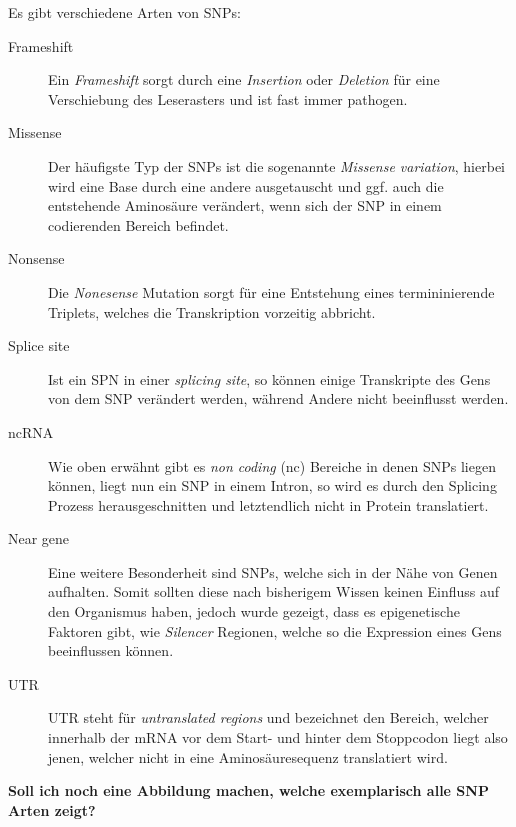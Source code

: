 Es gibt verschiedene Arten von \ac{SNPs}:

\begin{description}
\item[Frameshift]
Ein \emph{Frameshift} sorgt durch eine \emph{Insertion} oder \emph{Deletion} für eine Verschiebung des Leserasters und ist fast immer pathogen.
\item[Missense]
Der häufigste Typ der \ac{SNPs} ist die sogenannte \emph{Missense variation}, hierbei wird eine Base durch eine andere ausgetauscht und ggf. auch die entstehende Aminosäure verändert, wenn sich der \ac{SNP} in einem codierenden Bereich befindet. 
\item[Nonsense]
Die \emph{Nonesense} Mutation sorgt für eine Entstehung eines termininierende Triplets, welches die Transkription vorzeitig abbricht.
\item[Splice site]
Ist ein SPN in einer \emph{splicing site}, so können einige Transkripte des Gens von dem \ac{SNP} verändert werden, während Andere nicht beeinflusst werden.
\item[ncRNA]
Wie oben erwähnt gibt es \emph{non coding} (nc) Bereiche in denen \ac{SNPs} liegen können, liegt nun ein \ac{SNP} in einem Intron, so wird es durch den Splicing Prozess herausgeschnitten und letztendlich nicht in Protein translatiert. 
\item[Near gene]
Eine weitere Besonderheit sind SNPs, welche sich in der Nähe von Genen aufhalten. Somit sollten diese nach bisherigem Wissen keinen Einfluss auf den Organismus haben, jedoch wurde gezeigt, dass es epigenetische Faktoren gibt, wie \emph{Silencer} Regionen, welche so die Expression eines Gens beeinflussen können\cite{Maston.2006}. 
\item[UTR]
UTR steht für \emph{untranslated regions} und bezeichnet den Bereich, welcher innerhalb der mRNA vor dem Start- und hinter dem Stoppcodon liegt also jenen, welcher nicht in eine Aminosäuresequenz translatiert wird.
\end{description}

\textbf{Soll ich noch eine Abbildung machen, welche exemplarisch alle \ac{SNP} Arten zeigt?}




